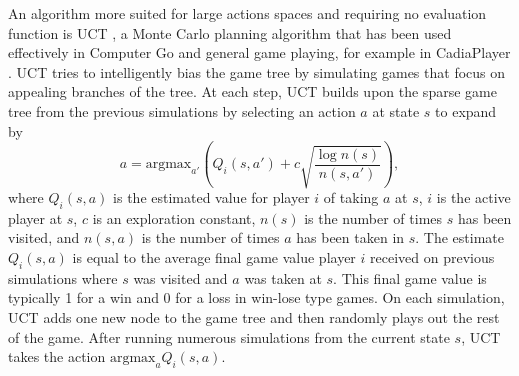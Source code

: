 \documentclass[letterpaper]{article}
\numberwithin{equation}{section}
\numberwithin{theorem}{section}
\numberwithin{lemma}{section}
\numberwithin{df}{section}
\begin{document}

An algorithm more suited for large actions spaces and requiring no evaluation function is UCT \cite{UCT}, a Monte Carlo planning algorithm that has been used effectively in Computer Go \cite{ComputerGo} and general game playing, for example in CadiaPlayer \cite{Cadia}.  UCT tries to intelligently bias the game tree by simulating games that focus on appealing branches of the tree.  At each step, UCT builds upon the sparse game tree from the previous simulations by selecting an action $a$ at state $s$ to expand by
\[ a = \text{argmax}_{a'} \left( Q_i(s,a') + c \sqrt{ \frac{\log n(s)}{n(s,a')} } \right), \]
where $Q_i(s,a)$ is the estimated value for player $i$ of taking $a$ at $s$, $i$ is the active player at $s$, $c$ is an exploration constant, $n(s)$ is the number of times $s$ has been visited, and $n(s,a)$ is the number of times $a$ has been taken in $s$.  The estimate $Q_i(s,a)$ is equal to the average final game value player $i$ received on previous simulations where $s$ was visited and $a$ was taken at $s$.  This final game value is typically 1 for a win and 0 for a loss in win-lose type games.  On each simulation, UCT adds one new node to the game tree and then randomly plays out the rest of the game.  After running numerous simulations from the current state $s$, UCT takes the action $\text{argmax}_{a}Q_i(s,a)$.
\end{document}
